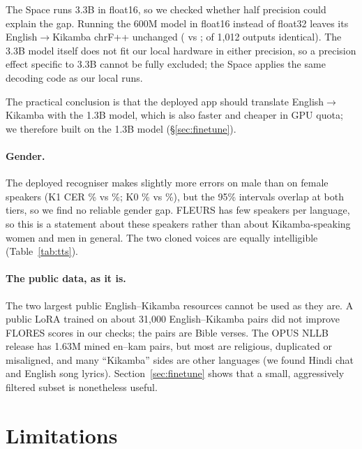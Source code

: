 \documentclass[11pt]{article}
\begin{document}
The Space runs 3.3B in float16, so we checked whether half precision could explain the gap. Running the 600M model in float16 instead of float32 leaves its English$\rightarrow$Kikamba chrF++ unchanged (\ctrlFpThirtyTwo{} vs \ctrlFpSixteen{}; \ctrlFpIdentical{} of 1,012 outputs identical). The 3.3B model itself does not fit our local hardware in either precision, so a precision effect specific to 3.3B cannot be fully excluded; the Space applies the same decoding code as our local runs.

The practical conclusion is that the deployed app should translate English$\rightarrow$Kikamba with the 1.3B model, which is also faster and cheaper in GPU quota; we therefore built on the 1.3B model (\S\ref{sec:finetune}).

\paragraph{Gender.} The deployed recogniser makes slightly more errors on male than on female speakers (K1 CER \asrFarmerlineKoneM{}\% vs \asrFarmerlineKoneF{}\%; K0 \asrFarmerlineKzeroM{}\% vs \asrFarmerlineKzeroF{}\%), but the 95\% intervals overlap at both tiers, so we find no reliable gender gap. FLEURS has few speakers per language, so this is a statement about these speakers rather than about Kikamba-speaking women and men in general. The two cloned voices are equally intelligible (Table~\ref{tab:tts}).

\paragraph{The public data, as it is.} The two largest public English--Kikamba resources cannot be used as they are. A public LoRA \citep{hu2022lora,knox2025kikamba} trained on about 31,000 English--Kikamba pairs did not improve FLORES scores in our checks; the pairs are Bible verses. The OPUS NLLB release has 1.63M mined en--kam pairs, but most are religious, duplicated or misaligned, and many ``Kikamba'' sides are other languages (we found Hindi chat and English song lyrics). Section~\ref{sec:finetune} shows that a small, aggressively filtered subset is nonetheless useful.

\section{Limitations}
\label{sec:limits}
\end{document}
